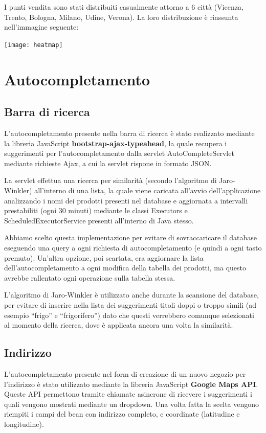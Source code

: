 I punti vendita sono stati distribuiti casualmente attorno a 6 città (Vicenza, Trento, Bologna, Milano, Udine, Verona). La loro distribuzione è riassunta nell'immagine seguente:
\begin{center}
  \texttt{[image: heatmap]}
\end{center}


\chapter{Autocompletamento}

\section{Barra di ricerca}
L'autocompletamento presente nella barra di ricerca è stato realizzato mediante la libreria JavaScript  \textbf{bootstrap-ajax-typeahead}, la quale recupera i suggerimenti per l'autocompletamento dalla servlet AutoCompleteServlet mediante richieste Ajax, a cui la servlet rispone in formato JSON.

La servlet effettua una ricerca per similarità (secondo l'algoritmo di Jaro-Winkler) all'interno di una lista, la quale viene caricata all'avvio dell'applicazione analizzando i nomi dei prodotti presenti nel database e aggiornata a intervalli prestabiliti (ogni 30 minuti) mediante le classi Executors e ScheduledExecutorService presenti all'interno di Java stesso.

Abbiamo scelto questa implementazione per evitare di sovraccaricare il database eseguendo una query a ogni richiesta di autocompletamento (e quindi a ogni tasto premuto).
Un'altra opzione, poi scartata, era aggiornare la lista dell'autocompletamento a ogni modifica della tabella dei prodotti, ma questo avrebbe rallentato ogni operazione sulla tabella stessa.

L'algoritmo di Jaro-Winkler è utilizzato anche durante la scansione del database, per evitare di inserire nella lista dei suggerimenti titoli doppi o troppo simili (ad esempio ``frigo'' e ``frigorifero'') dato che questi verrebbero comunque selezionati al momento della ricerca, dove è applicata ancora una volta la similarità.

\section{Indirizzo}
L'autocompletamento presente nel form di creazione di un nuovo negozio per l'indirizzo è stato utilizzato mediante la libreria JavaScript \textbf{Google Maps API}. Queste API permettono tramite chiamate asincrone di ricevere i suggerimenti i quali vengono mostrati mediante un dropdown. Una volta fatta la scelta vengono riempiti i campi del bean con indirizzo completo, e coordinate (latitudine e longitudine).

